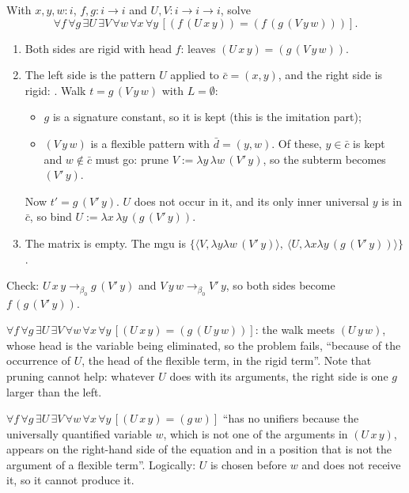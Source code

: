\begin{example}\label{ex:hounif-8h}
With $x,y,w:i$, $f,g:i\to i$ and $U,V:i\to i\to i$, solve
\[
  \forall f\,\forall g\,\exists U\,\exists V\,\forall w\,\forall x\,\forall y\,[(f\,(U\,x\,y))=(f\,(g\,(V\,y\,w)))].
\]
\end{example}
\begin{tutorial}
\begin{enumerate}
  \item Both sides are rigid with head $f$:  leaves $(U\,x\,y)=(g\,(V\,y\,w))$.
  \item The left side is the pattern $U$ applied to $\bar c=(x,y)$, and the right side is rigid: .
    Walk $t=g\,(V\,y\,w)$ with $L=\emptyset$:
    \begin{itemize}[nosep]
      \item $g$ is a signature constant, so it is kept (this is the imitation part);
      \item $(V\,y\,w)$ is a flexible pattern with $\bar d=(y,w)$. Of these, $y\in\bar c$ is kept and $w\notin\bar c$ must
        go: prune $V:=\lambda y\,\lambda w\,(V'\,y)$, so the subterm becomes $(V'\,y)$.
    \end{itemize}
    Now $t'=g\,(V'\,y)$. $U$ does not occur in it, and its only inner universal $y$ is in $\bar c$, so bind
    $U:=\lambda x\,\lambda y\,(g\,(V'\,y))$.
  \item The matrix is empty. The mgu is $\{\langle V,\lambda y\lambda w\,(V'\,y)\rangle,\ \langle U,\lambda x\lambda y\,(g\,(V'\,y))\rangle\}$
    .
\end{enumerate}
Check: $U\,x\,y\to_{\beta_0}g\,(V'\,y)$ and $V\,y\,w\to_{\beta_0}V'\,y$, so both sides become $f\,(g\,(V'\,y))$.
\end{tutorial}

\begin{example}\label{ex:hounif-8i}
$\forall f\,\forall g\,\exists U\,\exists V\,\forall w\,\forall x\,\forall y\,[(U\,x\,y)=(g\,(U\,y\,w))]$: the walk meets
$(U\,y\,w)$, whose head is the variable being eliminated, so the problem fails, \enquote{because of the occurrence of
$U$, the head of the flexible term, in the rigid term}. Note that pruning cannot help: whatever $U$ does with its
arguments, the right side is one $g$ larger than the left.
\end{example}

\begin{example}\label{ex:hounif-8j}
$\forall f\,\forall g\,\exists U\,\exists V\,\forall w\,\forall x\,\forall y\,[(U\,x\,y)=(g\,w)]$ \enquote{has no unifiers
because the universally quantified variable $w$, which is not one of the arguments in $(U\,x\,y)$, appears on the
right-hand side of the equation and in a position that is not the argument of a flexible term}. Logically: $U$ is
chosen before $w$ and does not receive it, so it cannot produce it.
\end{example}

